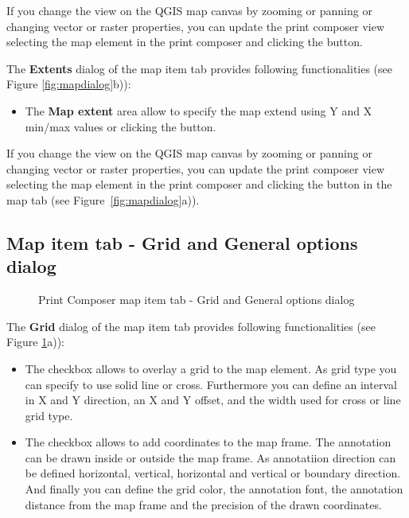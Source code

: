 If you change the view on the QGIS map canvas by zooming or panning or
changing vector or raster properties, you can update the print composer view
selecting the map element in the print composer and clicking the
 button.


The \textbf{Extents} dialog of the map item tab provides following functionalities
(see Figure \ref{fig:mapdialog}b)):

\begin{itemize}[label=--]
\item The \textbf{Map extent} area allow to specify the map extend using Y
and X min/max values or clicking the  button.
\end{itemize}

If you change the view on the QGIS map canvas by zooming or panning or
changing vector or raster properties, you can update the print composer view
selecting the map element in the print composer and clicking the
 button in the map  tab (see
Figure~\ref{fig:mapdialog}a)).

\subsection{Map item tab - Grid and General options dialog}

\begin{figure}[ht]
\centering
   \hspace{1cm}
   \caption{Print Composer map item tab - Grid and General options dialog \nixcaption}\label{fig:sec_map_dialog}
\end{figure}


The \textbf{Grid} dialog of the map item tab provides following functionalities
(see Figure \ref{fig:sec_map_dialog}a)):

\begin{itemize}[label=--]
\item The  checkbox allows to overlay a grid to the map
element. As grid type you can specify to use solid line or cross. Furthermore
you can define an interval in X and Y direction, an X and Y offset, and the
width used for cross or line grid type.
\item The  checkbox allows to add coordinates to
the map frame. The annotation can be drawn inside or outside the map frame.
As annotatiion direction can be defined horizontal, vertical, horizontal and
vertical or boundary direction. And finally you can define the grid color,
the annotation font, the annotation distance from the map frame and the
precision of the drawn coordinates.  
\end{itemize}

